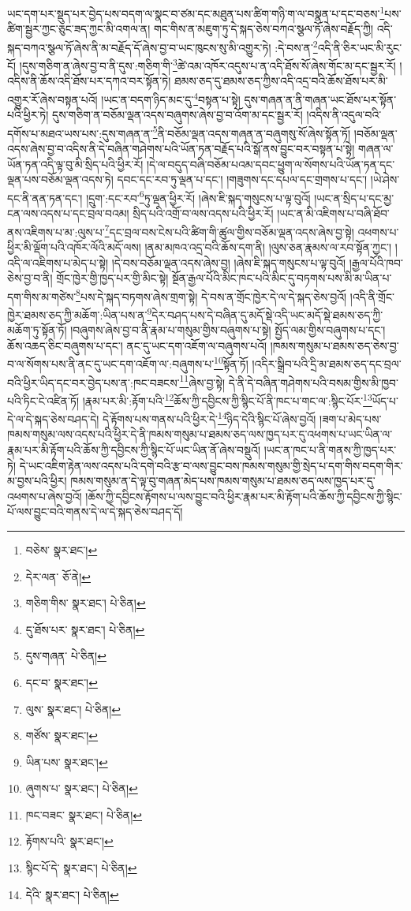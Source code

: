 ཡང་དག་པར་སྡུད་པར་བྱེད་པས་བདག་ལ་སྣང་བ་ཙམ་དང་མཐུན་པས་ཚིག་གཉི་ག་ལ་བསྣན་པ་དང་བཅས་\footnote{བཅེས་  སྣར་ཐང་། }པས་ཚིག་སྦྱར་ཀྱང་ཅུང་ཟད་ཀྱང་མི་འགལ་ན། གང་གིས་ན་མཇུག་ཏུ་དེ་སྐད་ཅེས་བཀའ་སྩལ་ཏོ་ཞེས་བརྗོད་ཀྱི། འདི་སྐད་བཀའ་སྩལ་ཏོ་ཞེས་ནི་མ་བརྗོད་དོ་ཞེས་བྱ་བ་ཡང་ཁུངས་སུ་མི་འགྱུར་ཏེ། :དེ་བས་ན་\footnote{དེར་ལན་  ཅོ་ནེ། }འདི་ནི་ཅིར་ཡང་མི་རུང་ངོ། །དུས་གཅིག་ན་ཞེས་བྱ་བ་ནི་དུས་:གཅིག་གི་\footnote{གཅིག་གིས་  སྣར་ཐང་།  པེ་ཅིན། }ཚེ་འམ་འཁོར་འདུས་པ་ན་འདི་ཐོས་སོ་ཞེས་གོང་མ་དང་སྦྱར་རོ། །འདིས་ནི་ཆོས་འདི་ཐོས་པར་དཀའ་བར་སྟོན་ཏེ། ཐམས་ཅད་དུ་ཐམས་ཅད་ཀྱིས་འདི་འདྲ་བའི་ཆོས་ཐོས་པར་མི་འགྱུར་རོ་ཞེས་བསྟན་པའོ། །ཡང་ན་བདག་ཉིད་མང་དུ་\footnote{དུ་ཐོས་པར་  སྣར་ཐང་།  པེ་ཅིན། }བསྟན་པ་སྟེ། དུས་གཞན་ན་ནི་གཞན་ཡང་ཐོས་པར་སྟོན་པའི་ཕྱིར་ཏེ། དུས་གཅིག་ན་བཅོམ་ལྡན་འདས་བཞུགས་ཞེས་བྱ་བ་འོག་མ་དང་སྦྱར་རོ། །འདིས་ནི་འདུལ་བའི་དགོས་པ་མཐའ་ཡས་པས་:དུས་གཞན་ན་\footnote{དུས་གཞན་  པེ་ཅིན། }ནི་བཅོམ་ལྡན་འདས་གཞན་ན་བཞུགསུ་སོ་ཞེས་སྟོན་ཏོ། །བཅོམ་ལྡན་འདས་ཞེས་བྱ་བ་འདིས་ནི་དེ་བཞིན་གཤེགས་པའི་ཡོན་ཏན་བརྗོད་པའི་སྒོ་ནས་བྱུང་བར་བསྟན་པ་སྟེ། གཞན་ལ་ཡོན་ཏན་འདི་ལྟ་བུ་མི་སྲིད་པའི་ཕྱིར་རོ། །དེ་ལ་བདུད་བཞི་བཅོམ་པའམ་དབང་ཕྱུག་ལ་སོགས་པའི་ཡོན་ཏན་དང་ལྡན་པས་བཅོམ་ལྡན་འདས་ཏེ། དབང་དང་རབ་ཏུ་ལྡན་པ་དང་། །གཟུགས་དང་དཔལ་དང་གྲགས་པ་དང་། །ཡེ་ཤེས་དང་ནི་ནན་ཏན་དང་། །དྲུག་:དང་རབ་\footnote{དང་བ་  སྣར་ཐང་། }ཏུ་ལྡན་ཕྱིར་རོ། །ཞེས་ཇི་སྐད་གསུངས་པ་ལྟ་བུའོ། །ཡང་ན་སྲིད་པ་དང་མྱ་ངན་ལས་འདས་པ་དང་བྲལ་བའམ། སྲིད་པའི་འགྲོ་བ་ལས་འདས་པའི་ཕྱིར་རོ། །ཡང་ན་མི་འཇིགས་པ་བཞི་ཐོབ་ནས་འཇིགས་པ་མ་:ལུས་པ་\footnote{ལུས་  སྣར་ཐང་།  པེ་ཅིན། }དང་བྲལ་བས་ངེས་པའི་ཚིག་གི་ཚུལ་གྱིས་བཅོམ་ལྡན་འདས་ཞེས་བྱ་སྟེ། འཕགས་པ་ཕྱིར་མི་ལྡོག་པའི་འཁོར་ལོའི་མདོ་ལས། །ནམ་མཁའ་འདྲ་བའི་ཆོས་དག་ནི། །ལུས་ཅན་རྣམས་ལ་རབ་སྟོན་ཀྱང་། །འདི་ལ་འཇིགས་པ་མེད་པ་སྟེ། །དེ་བས་བཅོམ་ལྡན་འདས་ཞེས་བྱ། །ཞེས་ཇི་སྐད་གསུངས་པ་ལྟ་བུའོ། །རྒྱལ་པོའི་ཁབ་ཅེས་བྱ་བ་ནི། གྲོང་ཁྱེར་གྱི་ཁྱད་པར་གྱི་མིང་སྟེ། སྔོན་རྒྱལ་པོའི་མིང་ཁང་པའི་མིང་དུ་བཏགས་པས་མི་མ་ཡིན་པ་དག་གིས་མ་གཙེས་\footnote{གཙོས་  སྣར་ཐང་། }པས་དེ་སྐད་བཏགས་ཞེས་གྲག་སྟེ། དེ་བས་ན་གྲོང་ཁྱེར་དེ་ལ་དེ་སྐད་ཅེས་བྱའོ། །འདི་ནི་གྲོང་ཁྱེར་ཐམས་ཅད་ཀྱི་མཆོག་:ཡིན་པས་ན་\footnote{ཡིན་པས་  སྣར་ཐང་། }དེར་བཤད་པས་དེ་བཞིན་དུ་མདོ་སྡེ་འདི་ཡང་མདོ་སྡེ་ཐམས་ཅད་ཀྱི་མཆོག་ཏུ་སྟོན་ཏོ། །བཞུགས་ཞེས་བྱ་བ་ནི་རྣམ་པ་གསུམ་གྱིས་བཞུགས་པ་སྟེ། སྤྱོད་ལམ་གྱིས་བཞུགས་པ་དང་། ཆོས་འཆད་ཅིང་བཞུགས་པ་དང་། ནང་དུ་ཡང་དག་འཇོག་ལ་བཞུགས་པའོ། །ཁམས་གསུམ་པ་ཐམས་ཅད་ཅེས་བྱ་བ་ལ་སོགས་པས་ནི་ནང་དུ་ཡང་དག་འཇོག་ལ་:བཞུགས་པ་\footnote{ཞུགས་པ་  སྣར་ཐང་།  པེ་ཅིན། }སྟོན་ཏོ། །འདིར་སྒྲིབ་པའི་དྲི་མ་ཐམས་ཅད་དང་བྲལ་བའི་ཕྱིར་ཡིད་དང་བར་བྱེད་པས་ན་:ཁང་བཟངས་\footnote{ཁང་བཟང་  སྣར་ཐང་།  པེ་ཅིན། }ཞེས་བྱ་སྟེ། དེ་ནི་དེ་བཞིན་གཤེགས་པའི་བསམ་གྱིས་མི་ཁྱབ་པའི་ཏིང་ངེ་འཛིན་ཏོ། །རྣམ་པར་མི་:རྟོག་པའི་\footnote{རྟོགས་པའི་  སྣར་ཐང་། }ཆོས་ཀྱི་དབྱིངས་ཀྱི་སྙིང་པོ་ནི་ཁང་པ་གང་ལ་:སྙིང་པོར་\footnote{སྙིང་པོ་དེ་  སྣར་ཐང་།  པེ་ཅིན། }ཡོད་པ་དེ་ལ་དེ་སྐད་ཅེས་བཤད་དེ། དེ་རྟོགས་པས་གནས་པའི་ཕྱིར་དེ་\footnote{དེའི་  སྣར་ཐང་།  པེ་ཅིན། }ཉིད་དེའི་སྙིང་པོ་ཞེས་བྱའོ། །ཟག་པ་མེད་པས་ཁམས་གསུམ་ལས་འདས་པའི་ཕྱིར་དེ་ནི་ཁམས་གསུམ་པ་ཐམས་ཅད་ལས་ཁྱད་པར་དུ་འཕགས་པ་ཡང་ཡིན་ལ་རྣམ་པར་མི་རྟོག་པའི་ཆོས་ཀྱི་དབྱིངས་ཀྱི་སྙིང་པོ་ཡང་ཡིན་ནོ་ཞེས་བསྡུའོ། །ཡང་ན་ཁང་པ་ནི་གནས་ཀྱི་ཁྱད་པར་ཏེ། དེ་ཡང་འཇིག་རྟེན་ལས་འདས་པའི་དགེ་བའི་རྩ་བ་ལས་བྱུང་བས་ཁམས་གསུམ་གྱི་སྲེད་པ་དག་གིས་བདག་གིར་མ་བྱས་པའི་ཕྱིར། ཁམས་གསུམ་ན་དེ་ལྟ་བུ་གཞན་མེད་པས་ཁམས་གསུམ་པ་ཐམས་ཅད་ལས་ཁྱད་པར་དུ་འཕགས་པ་ཞེས་བྱའོ། །ཆོས་ཀྱི་དབྱིངས་རྟོགས་པ་ལས་བྱུང་བའི་ཕྱིར་རྣམ་པར་མི་རྟོག་པའི་ཆོས་ཀྱི་དབྱིངས་ཀྱི་སྙིང་པོ་ལས་བྱུང་བའི་གནས་དེ་ལ་དེ་སྐད་ཅེས་བཤད་དོ། 